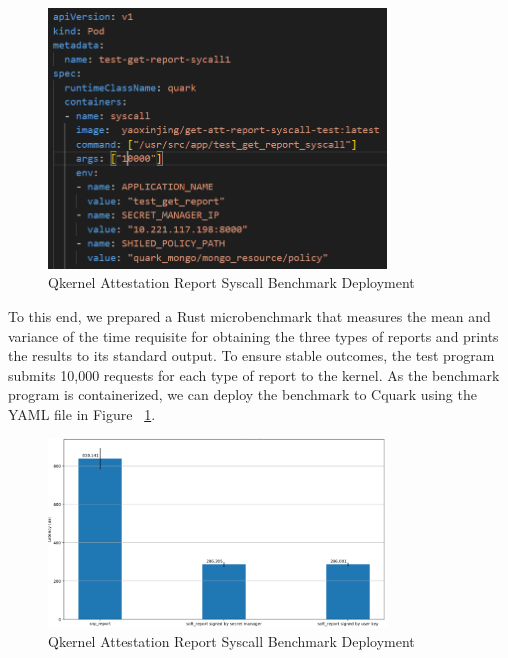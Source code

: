 \begin{figure}[H]
    \centering
    \includegraphics[width=0.8\textwidth]{images/perf_attestation_report_yaml.PNG}
    \caption[Qkernel Attestation Report Syscall Benchmark Deployment]{Qkernel Attestation Report Syscall Benchmark Deployment}
    \label{fig:perf_attestation_report_yaml}
\end{figure}

To this end, we prepared a Rust microbenchmark that measures the mean and variance of the time requisite for obtaining the three types of reports and prints the results to its standard output. To ensure stable outcomes, the test program submits 10,000 requests for each type of report to the kernel. 
As the benchmark program is containerized, we can deploy the benchmark to Cquark using the YAML file in Figure ~\ref*{fig:perf_attestation_report_yaml}.

\begin{figure}[H]
    \centering
    \includegraphics[width=0.8\textwidth]{images/perf_attestation_report_result.PNG}
    \caption[Benchmark result of Attestation Report Syscall]{Qkernel Attestation Report Syscall Benchmark Deployment}
    \label{fig:perf_attestation_report_result}
\end{figure}

